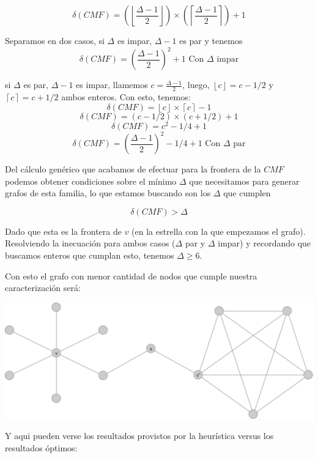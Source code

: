\[ \delta(CMF) = (\left\lfloor \frac{\Delta -1}{2} \right\rfloor) \times 
	(\left\lceil \frac{\Delta -1}{2} \right\rceil) + 1 \]

Separamos en dos casos, si $\Delta$ es impar, $\Delta -1$ es par y tenemos
\[ \boxed{\delta(CMF) = (\frac{\Delta -1}{2})^2 +1} \text{ Con $\Delta$ impar} \]

si $\Delta$ es par, $\Delta -1$ es impar, llamemos $c = \frac{\Delta -1}{2}$, luego, 
$\left\lfloor c \right\rfloor = c - 1/2$ y $\left\lceil c \right\rceil = c + 1/2$ 
ambos enteros. Con esto, tenemos:
\[ \delta(CMF) = \left\lfloor c \right\rfloor \times 
	\left\lceil c \right\rceil -1 \]
\[ \delta(CMF) = (c - 1/2) \times (c + 1/2) +1 \]
\[ \delta(CMF) = c^2 - 1/4 + 1 \]
\[ \boxed{\delta(CMF) = (\frac{\Delta -1 }{2})^2 -1/4 +1} \text{ Con $\Delta$ par}\]

Del c\'alculo gen\'erico que acabamos de efectuar para la frontera de la $CMF$
podemos obtener condiciones sobre el m\'inimo $\Delta$ que necesitamos para
generar grafos de esta familia, lo que estamos buscando son los $\Delta$ que cumplen

\[ \delta(CMF) > \Delta \]

Dado que esta es la frontera de $v$ (en la estrella con la que empezamos el grafo). Resolviendo la 
inecuaci\'on para ambos casos ($\Delta$ par y $\Delta$ impar) y recordando que buscamos
enteros que cumplan esto, tenemos $\Delta \geq 6$.


Con esto el grafo con menor cantidad de nodos que cumple nuestra caracterizaci\'on ser\'a:
\begin{center} 
	\includegraphics[scale = 0.3]{img/ej3/constructiva_golosa/vnotincmf_carac1_min_st0.png} 
\end{center}

Y aqui pueden verse los resultados provistos por la heur\'istica versus los resultados \'optimos:

\phantom{x}

